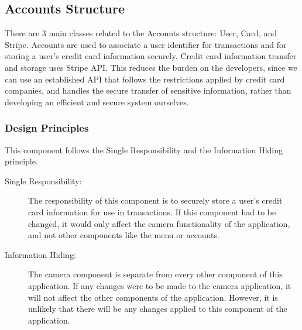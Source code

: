 \documentclass[12pt, titlepage]{article}
\begin{document}
\subsection{Accounts Structure}
There are 3 main classes related to the Accounts structure: User, Card, and Stripe. Accounts are used to associate a user identifier for transactions and for storing a user's credit card information securely. Credit card information transfer and storage uses Stripe API. This reduces the burden on the developers, since we can use an established API that follows the restrictions applied by credit card companies, and handles the secure transfer of sensitive information, rather than developing an efficient and secure system ourselves.

\subsubsection{Design Principles}
This component follows the Single Responsibility and the Information Hiding principle.  

\begin{description}
	\item[Single Responsibility:] The responsibility of this component is to securely store a user's credit card information for use in transactions. If this component had to be changed, it would only affect the camera functionality of the application, and not other components like the menu or accounts.
	\item[Information Hiding:] The camera component is separate from every other component of this application. If any changes were to be made to the camera application, it will not affect the other components of the application. However, it is unlikely that there will be any changes applied to this component of the application.
\end{description}
 
\end{document}
